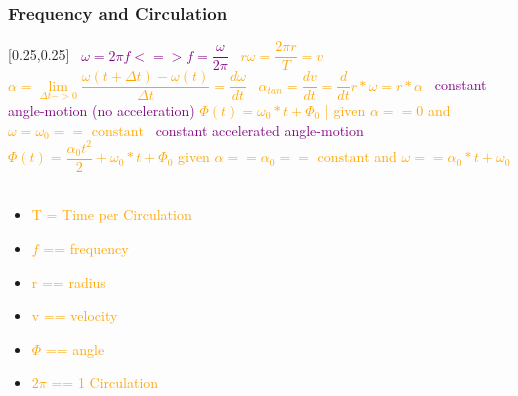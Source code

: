 \documentclass[main.tex,fontsize=8pt,paper=a4,paper=portrait,DIV=calc,]{scrartcl}
\begin{document}
\begin{multicols*}{2}
\subsubsection{Frequency and Circulation}
[0.25,0.25]
\, \newline
\large \textcolor{purple}{\( \omega = 2\pi f <=> f = \dfrac{\omega}{2\pi} \)}\newline
\, \newline
\large \textcolor{orange}{\( r \omega = \dfrac{2\pi r}{T} = v \)}\newline
\, \newline
\large \textcolor{orange}{\( \alpha = \underset{\Delta t -> 0}{\lim} \dfrac{\omega (t + \Delta t) - \omega (t)}{\Delta t} = \dfrac{d\omega}{dt} \)}\newline 
\, \newline
\large \textcolor{orange}{\( \alpha_{tan} = \dfrac{dv}{dt} = \dfrac{d}{dt}r * \omega = r * \alpha \)}\newline 
\, \newline
\textcolor{purple}{constant angle-motion (no acceleration)}\newline
\large \textcolor{orange}{\( \Phi(t) = \omega_0 * t + \Phi_0 \)  | given \(\alpha == 0 \) and \( \omega = \omega_0 == \text{ constant} \)}\newline
\, \newline
\textcolor{purple}{constant accelerated angle-motion}\newline
\large \textcolor{orange}{\( \Phi(t) = \dfrac{\alpha_0 t^2}{2} + \omega_0 * t + \Phi_0 \) \newline given \( \alpha == \alpha_0 == \text{ constant} \) and \(\omega == \alpha_0 * t + \omega_0 \) }\newline
\, \newline \normalsize
\begin{itemize}
\item \textcolor{orange}{T = Time per Circulation}
\item \textcolor{orange}{\(f\) == frequency}
\item \textcolor{orange}{r == radius}
\item \textcolor{orange}{v == velocity}
\item \textcolor{orange}{\(\Phi\) == angle}
\item \textcolor{orange}{\(2\pi\) == 1 Circulation}
\end{itemize}


\end{multicols*}
\end{document}
